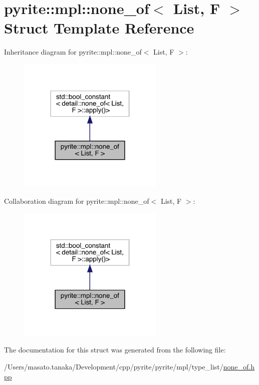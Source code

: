 \hypertarget{structpyrite_1_1mpl_1_1none__of}{}\section{pyrite\+:\+:mpl\+:\+:none\+\_\+of$<$ List, F $>$ Struct Template Reference}
\label{structpyrite_1_1mpl_1_1none__of}


Inheritance diagram for pyrite\+:\+:mpl\+:\+:none\+\_\+of$<$ List, F $>$\+:
\nopagebreak
\begin{figure}[H]
\begin{center}
\leavevmode
\includegraphics[width=197pt]{d6/d4d/structpyrite_1_1mpl_1_1none__of__inherit__graph}
\end{center}
\end{figure}


Collaboration diagram for pyrite\+:\+:mpl\+:\+:none\+\_\+of$<$ List, F $>$\+:
\nopagebreak
\begin{figure}[H]
\begin{center}
\leavevmode
\includegraphics[width=197pt]{d6/d55/structpyrite_1_1mpl_1_1none__of__coll__graph}
\end{center}
\end{figure}


The documentation for this struct was generated from the following file\+:\begin{DoxyCompactItemize}
\item 
/\+Users/masato.\+tanaka/\+Development/cpp/pyrite/pyrite/mpl/type\+\_\+list/\mbox{\hyperlink{none__of_8hpp}{none\+\_\+of.\+hpp}}\end{DoxyCompactItemize}
